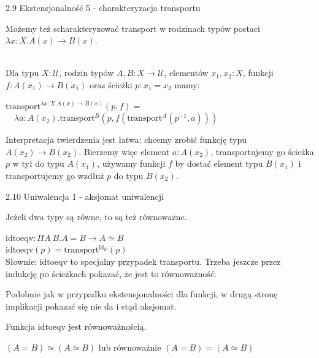 \documentclass{beamer}
\newcommand{\U}{\mathcal{U}}
\newcommand{\id}{\text{id}}
\newcommand{\transport}{\text{transport}}
\newcommand{\idtoeqv}{\text{idtoeqv}}
\begin{document}
\begin{frame}{2.9 Ekstensjonalność 5 - charakteryzacja transportu}

Możemy też scharakteryzować transport w rodzinach typów postaci $\lambda x : X. A(x) \to B(x)$. \\~\

Dla typu $X : \U$, rodzin typów $A, B : X \to \U$, elementów $x_1, x_2 : X$, funkcji $f : A(x_1) \to B(x_1)$ oraz ścieżki $p : x_1 = x_2$ mamy:

\begin{theorem}
$\transport^{\lambda x : X. A(x) \to B(x)}(p, f) =$ \\
$\quad \lambda a : A(x_2). \transport^B(p, f(\transport^A(p^{-1}, a)))$
\end{theorem}

Interpretacja twierdzenia jest łatwa: chcemy zrobić funkcję typu $A(x_2) \to B(x_2)$. Bierzemy więc element $a : A(x_2)$, transportujemy go ścieżka $p$ w tył do typu $A(x_1)$, używamy funkcji $f$ by dostać element typu $B(x_1)$ i transportujemy go wzdłuż $p$ do typu $B(x_2)$.

\end{frame}

\begin{frame}{2.10 Uniwalencja 1 - aksjomat uniwalencji}

Jeżeli dwa typy są równe, to są też równoważne.

\begin{definition}[2.10.2]
$\idtoeqv: \Pi A\ B. A = B \to A \simeq B$ \\
$\idtoeqv(p) = \transport^{\id_\U}(p)$ \\

Słownie: $\idtoeqv$ to specjalny przypadek transportu. Trzeba jeszcze przez indukcję po ścieżkach pokazać, że jest to równoważność.
\end{definition}

Podobnie jak w przypadku ekstensjonalności dla funkcji, w drugą stronę implikacji pokazać się nie da i stąd aksjomat.

\begin{definition}
Funkcja $\idtoeqv$ jest równoważnością.
\end{definition}

\begin{corollary}
$(A = B) \simeq (A \simeq B)$ lub równoważnie $(A = B) = (A \simeq B)$
\end{corollary}

\end{frame}
\end{document}
